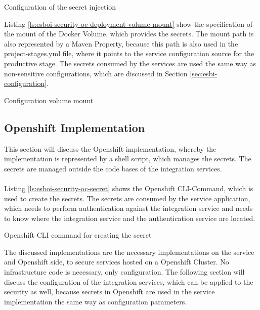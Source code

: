 \begin{listing}
	\caption{Configuration of the secret injection}
	\label{ls:esboi-security-oc-deployment-volume-secret}
\end{listing}

Listing \vref{ls:esboi-security-oc-deployment-volume-mount} show the specification of the mount of the Docker Volume, which provides the secrets. The mount path is also represented by a Maven Property, because this path is also used in the project-stages.yml file, where it points to the service configuration source for the productive stage. The secrets consumed by the services are used the same way as non-sensitive configurations, which are discussed in Section \vref{sec:esbi-configuration}.

\begin{listing}
	\caption{Configuration volume mount}
	\label{ls:esboi-security-oc-deployment-volume-mount}
\end{listing}

\subsection{Openshift Implementation}
\label{sec:esbi-security-openshift}
This section will discuss the Openshift implementation, whereby the implementation is represented by a shell script, which manages the secrets. The secrets are managed outside the code bases of the integration services.
\\ \\
Listing \vref{ls:esboi-security-oc-secret} shows the Openshift CLI-Command, which is used to create the secrets. The secrets are consumed by the service application, which needs to perform authentication against the integration service and needs to know where the integration service and the authentication service are located. 

\begin{listing}
	\caption{Openshift CLI command for creating the secret}
	\label{ls:esboi-security-oc-secret}
\end{listing}

The discussed implementations are the necessary implementations on the service and Openshift side, to secure services hosted on a Openshift Cluster. No infrastructure code is necessary, only configuration. The following section will discuss the configuration of the integration services, which can be applied to the security as well, because secrets in Openshift are used in the service implementation the same way as configuration parameters.

